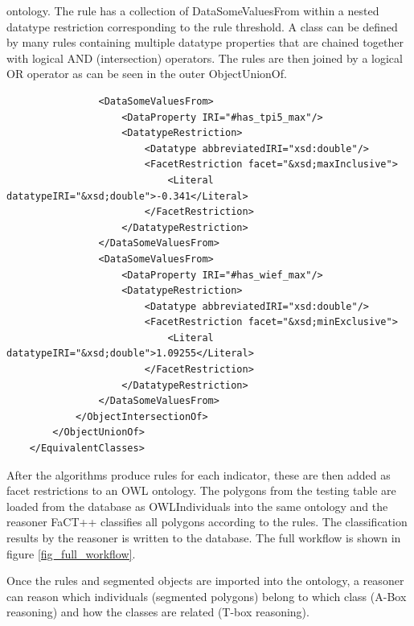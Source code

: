 \documentclass[authoryear, review,12pt,number]{elsarticle}
\begin{document}
ontology. The rule has a collection of DataSomeValuesFrom within a nested datatype
restriction corresponding to the rule threshold. A class can be defined by
many rules containing multiple datatype properties that are chained together
with logical AND (intersection) operators. The rules are then joined by a
logical OR operator as can be seen in the outer ObjectUnionOf.  
\label{dt_rule_snippet_owl}
\begin{lstlisting}
                <DataSomeValuesFrom>
                    <DataProperty IRI="#has_tpi5_max"/>
                    <DatatypeRestriction>
                        <Datatype abbreviatedIRI="xsd:double"/>
                        <FacetRestriction facet="&xsd;maxInclusive">
                            <Literal datatypeIRI="&xsd;double">-0.341</Literal>
                        </FacetRestriction>
                    </DatatypeRestriction>
                </DataSomeValuesFrom>
                <DataSomeValuesFrom>
                    <DataProperty IRI="#has_wief_max"/>
                    <DatatypeRestriction>
                        <Datatype abbreviatedIRI="xsd:double"/>
                        <FacetRestriction facet="&xsd;minExclusive">
                            <Literal datatypeIRI="&xsd;double">1.09255</Literal>
                        </FacetRestriction>
                    </DatatypeRestriction>
                </DataSomeValuesFrom>
            </ObjectIntersectionOf>
        </ObjectUnionOf>
    </EquivalentClasses>
\end{lstlisting}
After the algorithms produce rules for each indicator, these are then added as
facet restrictions to an OWL ontology.  The polygons from the testing table are
loaded from the database as OWLIndividuals into the same ontology and the
reasoner FaCT++ classifies all polygons according to the rules. The
classification results by the reasoner is written to the database. The full
workflow is shown in figure 
\ref{fig_full_workflow}.

Once the
rules and segmented objects are imported into the ontology, a reasoner can
reason which individuals (segmented polygons) belong to which class (A-Box 
reasoning) and how the classes are related (T-box reasoning).
\end{document}
